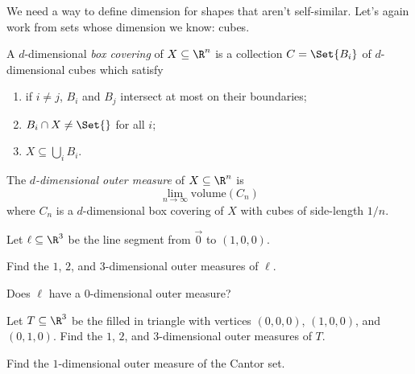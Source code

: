 	We need a way to define dimension for shapes that aren't self-similar. Let's again work from
	sets whose dimension we know: cubes.

	\begin{definition}
		A $d$-dimensional \emph{box covering} of $X\subseteq \R^n$ is a collection $C=\Set{B_i}$ of 
		$d$-dimensional cubes which satisfy
		\begin{enumerate}
			\item if $i\neq j$, $B_i$ and $B_j$ intersect at most on their boundaries;
			\item $B_i\cap X\neq \Set{}$ for all $i$;
			\item $X\subseteq \bigcup_{i} B_i$.
		\end{enumerate}
	\end{definition}

	\begin{definition}
		The \emph{$d$-dimensional outer measure} of $X\subseteq \R^n$ is
		\[
			\lim_{n\to\infty} \text{volume}(C_n)
		\]
		where $C_n$ is a $d$-dimensional box covering of $X$ with cubes of side-length $1/n$.
	\end{definition}

	\question
	Let $\ell\subseteq \R^3$ be the line segment from $\vec 0$ to $(1,0,0)$.
	\begin{parts}
		\item Find the $1$, $2$, and $3$-dimensional outer measures of $\ell$.
		\item Does $\ell$ have a $0$-dimensional outer measure?
		\item Let $T\subseteq \R^3$ be the filled in triangle with vertices $(0,0,0)$, $(1,0,0)$,
			and $(0,1,0)$. Find the $1$, $2$, and $3$-dimensional outer measures of $T$.
		\item Find the $1$-dimensional outer measure of the Cantor set.
	\end{parts}
	

